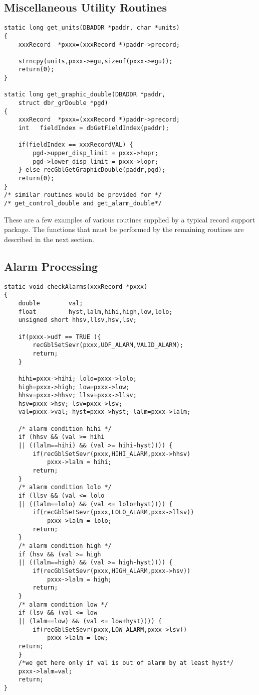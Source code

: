\subsection{Miscellaneous Utility Routines}

\begin{verbatim}
static long get_units(DBADDR *paddr, char *units)
{
    xxxRecord  *pxxx=(xxxRecord *)paddr->precord;

    strncpy(units,pxxx->egu,sizeof(pxxx->egu));
    return(0);
}

static long get_graphic_double(DBADDR *paddr,
    struct dbr_grDouble *pgd)
{
    xxxRecord  *pxxx=(xxxRecord *)paddr->precord;
    int   fieldIndex = dbGetFieldIndex(paddr);

    if(fieldIndex == xxxRecordVAL) {
        pgd->upper_disp_limit = pxxx->hopr;
        pgd->lower_disp_limit = pxxx->lopr;
    } else recGblGetGraphicDouble(paddr,pgd);
    return(0);
}
/* similar routines would be provided for */
/* get_control_double and get_alarm_double*/
\end{verbatim}

These are a few examples of various routines supplied by a typical record support package.
The functions that must be performed by the remaining routines are described in the next section.

\subsection{Alarm Processing}

\begin{verbatim}
static void checkAlarms(xxxRecord *pxxx)
{
    double        val;
    float         hyst,lalm,hihi,high,low,lolo;
    unsigned short hhsv,llsv,hsv,lsv;

    if(pxxx->udf == TRUE ){
        recGblSetSevr(pxxx,UDF_ALARM,VALID_ALARM);
        return;
    }

    hihi=pxxx->hihi; lolo=pxxx->lolo;
    high=pxxx->high; low=pxxx->low;
    hhsv=pxxx->hhsv; llsv=pxxx->llsv;
    hsv=pxxx->hsv; lsv=pxxx->lsv;
    val=pxxx->val; hyst=pxxx->hyst; lalm=pxxx->lalm;

    /* alarm condition hihi */
    if (hhsv && (val >= hihi 
    || ((lalm==hihi) && (val >= hihi-hyst)))) {
        if(recGblSetSevr(pxxx,HIHI_ALARM,pxxx->hhsv)
            pxxx->lalm = hihi;
        return;
    }
    /* alarm condition lolo */
    if (llsv && (val <= lolo 
    || ((lalm==lolo) && (val <= lolo+hyst)))) {
        if(recGblSetSevr(pxxx,LOLO_ALARM,pxxx->llsv))
            pxxx->lalm = lolo;
        return;
    }
    /* alarm condition high */
    if (hsv && (val >= high 
    || ((lalm==high) && (val >= high-hyst)))) {
        if(recGblSetSevr(pxxx,HIGH_ALARM,pxxx->hsv))
            pxxx->lalm = high;
        return;
    }
    /* alarm condition low */
    if (lsv && (val <= low 
    || (lalm==low) && (val <= low+hyst)))) {
        if(recGblSetSevr(pxxx,LOW_ALARM,pxxx->lsv))
            pxxx->lalm = low;
    return;
    }
    /*we get here only if val is out of alarm by at least hyst*/
    pxxx->lalm=val;
    return;
}
\end{verbatim}

